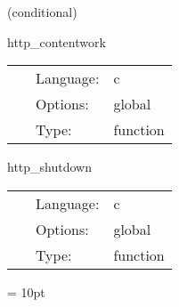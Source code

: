 \vspace{5mm}

   (conditional) 

\hspace{5mm} http\_contentwork 

\hspace{5mm}{\it content working routine } 


\hspace{5mm}

 \begin{tabular*}{160mm}{cll} 
~ & Language:  & c \\ 
~ & Options:  & global \\ 
~ & Type:  & function \\ 
\end{tabular*} 


\vspace{5mm}


\hspace{5mm} http\_shutdown 

\hspace{5mm}{\it http daemon shutdown } 


\hspace{5mm}

 \begin{tabular*}{160mm}{cll} 
~ & Language:  & c \\ 
~ & Options:  & global \\ 
~ & Type:  & function \\ 
\end{tabular*} 



\vspace{5mm}\parskip = 10pt 
